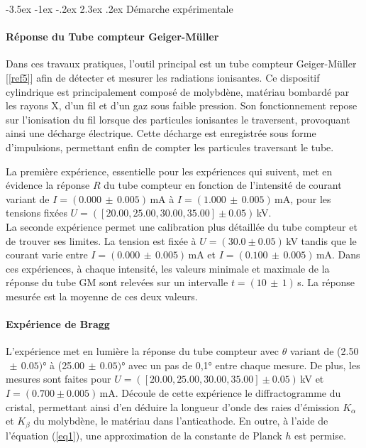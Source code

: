 \documentclass[a4paper, 12pt,oneside]{article}
\makeatletter
\renewcommand{\section}{\@startsection {section}{1}{\z@}%
             {-3.5ex \@plus -1ex \@minus -.2ex}%
             {2.3ex \@plus.2ex}%
             {\normalfont\normalsize\bfseries}}
\makeatother
\begin{document}
\section{Démarche expérimentale}
\vspace{-0.2cm}
\paragraph{Réponse du Tube compteur Geiger-Müller}
Dans ces travaux pratiques, l'outil principal est un tube compteur Geiger-Müller [\ref{ref5}] afin de détecter et mesurer les radiations ionisantes. Ce dispositif cylindrique est principalement composé de molybdène, matériau bombardé par les rayons X, d'un fil et d'un gaz sous faible pression. Son fonctionnement repose sur l'ionisation du fil lorsque des particules ionisantes le traversent, provoquant ainsi une décharge électrique. Cette décharge est enregistrée sous forme d'impulsions, permettant enfin de compter les particules traversant le tube.

La première expérience, essentielle pour les expériences qui suivent, met en évidence la réponse $R$ du tube compteur en fonction de l'intensité de courant variant de $I=(0.000\,\pm\,0.005)\,$mA à $I=(1.000\,\pm\,0.005)\,$mA, pour les tensions fixées $U=([20.00,25.00,30.00,35.00]\pm0.05)$\,kV. \\
La seconde expérience permet une calibration plus détaillée du tube compteur et de trouver ses limites. La tension est fixée à $U=(30.0\pm0.05)$\,kV tandis que le courant varie entre $I=(0.000\,\pm\,0.005)\,$mA et $I=(0.100\,\pm\,0.005)\,$mA. Dans ces expériences, à chaque intensité, les valeurs minimale et maximale de la réponse du tube GM sont relevées sur un intervalle $t=(10\,\pm\,1)$\,s. La réponse mesurée est la moyenne de ces deux valeurs.
\vspace{-0.2cm}

\paragraph{Expérience de Bragg}
L'expérience met en lumière la réponse du tube compteur avec $\theta$ variant de (2.50$\,\pm\,0.05)$° à (25.00$\,\pm\,0.05)$° avec un pas de 0,1° entre chaque mesure. De plus, les mesures sont faites pour $U=([20.00,25.00,30.00,35.00]\pm0.05)$\,kV et $I=(0.700\pm 0.005)$\,mA.
Découle de cette expérience le diffractogramme du cristal, permettant ainsi d'en déduire la longueur d'onde des raies d'émission $K_{\alpha}$ et $K_{\beta}$ du molybdène, le matériau dans l'anticathode. En outre, à l'aide de l'équation (\ref{eq1}), une approximation de la constante de Planck $h$ est permise.
\clearpage
\end{document}
